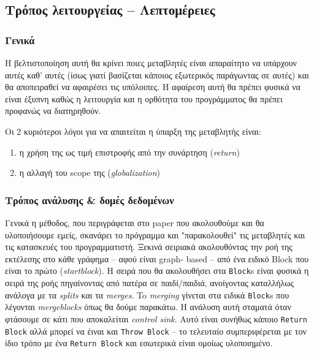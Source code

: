 
\subsection{Τρόπος λειτουργείας – Λεπτομέρειες} %

\subsubsection{Γενικά}

Η βελτιστοποίηση αυτή θα κρίνει ποιες μεταβλητές είναι απαραίτητο να υπάρχουν
αυτές καθ' αυτές (ίσως γιατί βασίζεται κάποιος εξωτερικός παράγωντας σε αυτές)
και θα αποπειραθεί να αφαιρέσει τις υπόλοιπες. Η αφαίρεση αυτή θα πρέπει φυσικά
να είναι έξυπνη καθώς η λειτουργία και η ορθότητα του προγράμματος θα πρέπει
προφανώς να διατηρηθούν.

Οι 2 κυριότεροι λόγοι για να απαιτείται η ύπαρξη της μεταβλητής είναι:
\begin{enumerate}
\item η χρήση της ως τιμή επιστροφής από την συνάρτηση (\textit{return})
\item η αλλαγή του scope της (\textit{globalization})
\end{enumerate} 

\subsubsection{Τρόπος ανάλυσης \& δομές δεδομένων}

Γενικά η μέθοδος, που περιγράφεται στο paper που ακολουθούμε
\cite{stadler2014partial} και θα υλοποιήσουμε εμείς, σκανάρει το πρόγραμμα και
"παρακολουθεί" τις μεταβλητές και τις κατασκευές του προγραμματιστή. Ξεκινά
σειριακά ακολουθόντας την ροή της εκτέλεσης στο κάθε γράφημα – αφού είναι graph-
based – από ένα ειδικό Block που είναι το πρώτο (\textit{startblock}). Η σειρά
που θα ακολουθήσει στα \texttt{Block}s είναι φυσικά η σειρά της ροής πηγαίνοντας
από πατέρα σε παιδί/παιδιά, ανοίγοντας καταλλήλως ανάλογα με τα \textit{splits}
και τα \textit{merges}. To \textit{merging} γίνεται στα ειδικά \texttt{Block}s
που λέγονται \textit{mergeblocks} όπως θα δούμε παρακάτω. Η ανάλυση αυτή σταματά
όταν φτάσουμε σε κάτι που αποκαλείται \textit{control sink}. Αυτό είναι συνήθως
κάποιο \texttt{Return Block} αλλά μπορεί να έιναι και \texttt{Throw Block} – το
τελευταίο συμπεριφέρεται με τον ίδιο τρόπο με ένα \texttt{Return Block} και
εσωτερικά είναι ομοίως υλοποιημένο.

